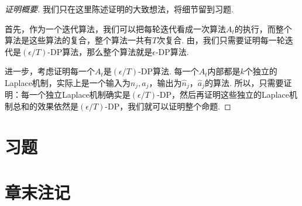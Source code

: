 \begin{proof}[证明概要]
我们只在这里陈述证明的大致想法，将细节留到习题.

首先，作为一个迭代算法，我们可以把每轮迭代看成一次算法$A_t$的执行，而整个算法是这些算法的复合，整个算法一共有$T$次复合. 由，我们只需要证明每一轮迭代是$(\epsilon/T)$-DP算法，那么整个算法就是$\epsilon$-DP算法.

进一步，考虑证明每一个$A_t$是$(\epsilon/T)$-DP算法. 每一个$A_t$内部都是$k$个独立的Laplace机制，实际上是一个输入为$n_j,a_j$，输出为$\hat{n}_j$，$\hat{a}_j$的算法. 所以，只需要证明：每一个独立Laplace机制确实是$(\epsilon/T)$-DP，然后再证明这些独立的Laplace机制总和的效果依然是$(\epsilon/T)$-DP，我们就可以证明整个命题.
\end{proof}

\section{习题}

\section{章末注记}
